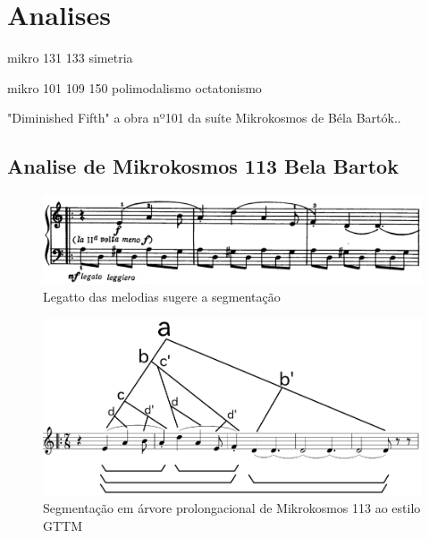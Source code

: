 \documentclass[
	12pt,				%
	openright,			%
	twoside,			%
	a4paper,			%
	english,			%
	french,				%
	spanish,			%
	brazil				%
	]{abntex2}
\begin{document}
\chapter{Analises}
\label{experimetosanalises}

mikro 131 133 simetria
\cite[pgs.198-200]{antokoletz1984music}

mikro 101 109 150 polimodalismo octatonismo 
\cite[pgs.250-254]{antokoletz1984music}



"Diminished Fifth" a obra nº101 da suíte Mikrokosmos de Béla Bartók.\cite[pgs.112,116-117,135-136]{lester1989analytic}.








\section{Analise de Mikrokosmos 113 Bela Bartok}

\begin{figure}[htb]
	\caption{\label{fig_grafico}Legatto das melodias sugere a segmentação}
	\begin{center}
	    \includegraphics[scale=0.35]{mikro/mikro113-intro.png}
	\end{center}
\end{figure}

\begin{figure}[htb]
	\caption{\label{fig_grafico}Segmentação em árvore prolongacional de Mikrokosmos 113 ao estilo GTTM}
	\begin{center}
	    \includegraphics[scale=0.45]{mikro/mikro113_GTTM_tree.png}
	\end{center}
\end{figure}
\end{document}
